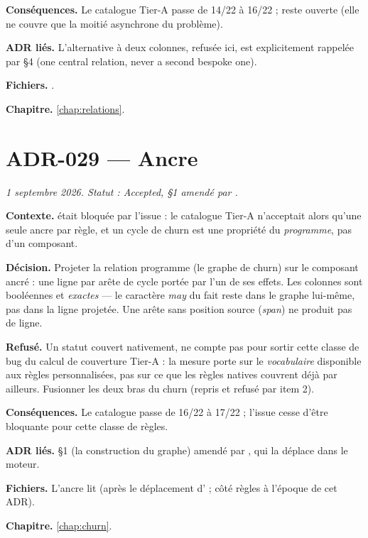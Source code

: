 \textbf{Conséquences.} Le catalogue Tier-A passe de 14/22 à 16/22 ;
 reste ouverte (elle ne couvre que la moitié asynchrone du
problème).

\textbf{ADR liés.} L'alternative à deux colonnes, refusée ici, est
explicitement rappelée par  §4 (\og one central relation, never a
second bespoke one\fg{}).

\textbf{Fichiers.} .

\textbf{Chapitre.} \cref{chap:relations}.

\section{ADR-029 --- Ancre }
\label{adr:29}
\noindent\textit{1{\ier} septembre 2026. Statut : Accepted, §1 amendé par .}

\textbf{Contexte.}  était bloquée par
l'issue  : le catalogue Tier-A n'acceptait alors qu'une seule ancre
par règle, et un cycle de churn est une propriété du \emph{programme}, pas
d'un composant.

\textbf{Décision.} Projeter la relation programme (le graphe de churn) sur le
composant \og ancré\fg{} : une ligne par arête de cycle portée par l'un de ses
effets. Les colonnes sont booléennes et \emph{exactes} --- le caractère
\emph{may} du fait reste dans le graphe lui-même, pas dans la ligne projetée.
Une arête sans position source (\emph{span}) ne produit pas de ligne.

\textbf{Refusé.} Un statut \og couvert nativement, ne compte pas\fg{} pour
sortir cette classe de bug du calcul de couverture Tier-A : la mesure porte
sur le \emph{vocabulaire} disponible aux règles personnalisées, pas sur ce que
les règles natives couvrent déjà par ailleurs. Fusionner les deux bras du
churn (repris et refusé par  item 2).

\textbf{Conséquences.} Le catalogue passe de 16/22 à 17/22 ; l'issue
 cesse d'être bloquante pour cette classe de règles.

\textbf{ADR liés.} §1 (la construction du graphe) amendé par , qui la
déplace dans le moteur.

\textbf{Fichiers.} L'ancre  lit 
(après le déplacement d' ; côté règles à l'époque de cet ADR).

\textbf{Chapitre.} \cref{chap:churn}.

